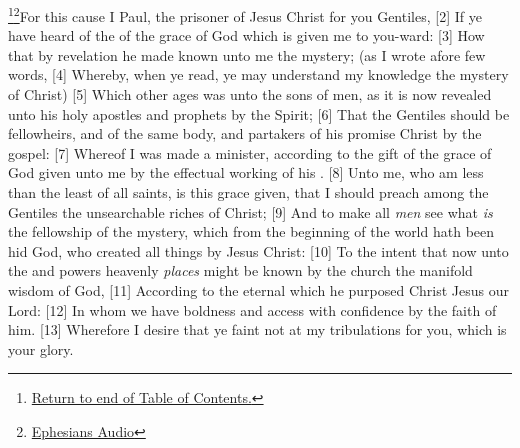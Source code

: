 \footnote{\textcolor[cmyk]{0.99998,1,0,0}{\hyperlink{TOC}{Return to end of Table of Contents.}}}\footnote{\href{https://www.audioverse.org/english/audiobibles/books/ENGKJV/N/Eph/1}{\textcolor[cmyk]{0.99998,1,0,0}{Ephesians Audio}}}\textcolor[cmyk]{0.99998,1,0,0}{For this cause I Paul, the prisoner of Jesus Christ for you Gentiles,}
[2] \textcolor[cmyk]{0.99998,1,0,0}{If ye have heard of the  of the grace of God which is given me to you-ward:}
[3] \textcolor[cmyk]{0.99998,1,0,0}{How that by revelation he made known unto me the mystery; (as I wrote afore  few words,}
[4] \textcolor[cmyk]{0.99998,1,0,0}{Whereby, when ye read, ye may understand my knowledge  the mystery of Christ)}
[5] \textcolor[cmyk]{0.99998,1,0,0}{Which  other ages was  unto the sons of men, as it is now revealed unto his holy apostles and prophets by the Spirit;}
[6] \textcolor[cmyk]{0.99998,1,0,0}{That the Gentiles should be fellowheirs, and of the same body, and partakers of his promise  Christ by the gospel:}
[7] \textcolor[cmyk]{0.99998,1,0,0}{Whereof I was made a minister, according to the gift of the grace of God given unto me by the effectual working of his .}
[8] \textcolor[cmyk]{0.99998,1,0,0}{Unto me, who am less than the least of all saints, is this grace given, that I should preach among the Gentiles the unsearchable riches of Christ;}
[9] \textcolor[cmyk]{0.99998,1,0,0}{And to make all \emph{men} see what \emph{is} the fellowship of the mystery, which from the beginning of the world hath been hid  God, who created all things by Jesus Christ:}
[10] \textcolor[cmyk]{0.99998,1,0,0}{To the intent that now unto the  and powers  heavenly \emph{places} might be known by the church the manifold wisdom of God,}
[11] \textcolor[cmyk]{0.99998,1,0,0}{According to the eternal  which he purposed  Christ Jesus our Lord:}
[12] \textcolor[cmyk]{0.99998,1,0,0}{In whom we have boldness and access with confidence by the faith of him.}
[13] \textcolor[cmyk]{0.99998,1,0,0}{Wherefore I desire that ye faint not at my tribulations for you, which is your glory.}
